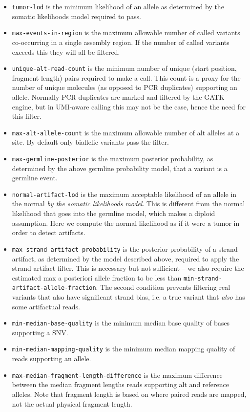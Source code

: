 \documentclass[nofootinbib,amssymb,amsmath]{revtex4}
\newcommand{\code}[1]{\texttt{#1}}
\begin{document}
\begin{itemize}
\item  \code{tumor-lod} is the minimum likelihood of an allele as determined by the somatic likelihoods model required to pass.
\item \code{max-events-in-region} is the maximum allowable number of called variants co-occurring in a single assembly region.  If the number of called variants exceeds this they will all be filtered.
\item \code{unique-alt-read-count} is the minimum number of unique (start position, fragment length) pairs required to make a call.  This count is a proxy for the number of unique molecules (as opposed to PCR duplicates) supporting an allele.  Normally PCR duplicates are marked and filtered by the GATK engine, but in UMI-aware calling this may not be the case, hence the need for this filter.
\item \code{max-alt-allele-count} is the maximum allowable number of alt alleles at a site.  By default only biallelic variants pass the filter.
\item \code{max-germline-posterior} is the maximum posterior probability, as determined by the above germline probability model, that a variant is a germline event.
\item \code{normal-artifact-lod} is the maximum acceptable likelihood of an allele in the normal \textit{by the somatic likelihoods model}.  This is different from the normal likelihood that goes into the germline model, which makes a diploid assumption.  Here we compute the normal likelihood as if it were a tumor in order to detect artifacts.  
\item \code{max-strand-artifact-probability} is the posterior probability of a strand artifact, as determined by the model described above, required to apply the strand artifact filter.  This is necessary but not sufficient -- we also require the estimated max a posteriori allele fraction to be less than \code{min-strand-artifact-allele-fraction}.  The second condition prevents filtering real variants that also have significant strand bias, i.e. a true variant that \textit{also} has some artifactual reads.
\item \code{min-median-base-quality} is the minimum median base quality of bases supporting a SNV.
\item \code{min-median-mapping-quality} is the minimum median mapping quality of reads supporting an allele.
\item \code{max-median-fragment-length-difference} is the maximum difference between the median fragment lengths reads supporting alt and reference alleles.  Note that fragment length is based on where paired reads are mapped, not the actual physical fragment length.

\end{itemize}
\end{document}
